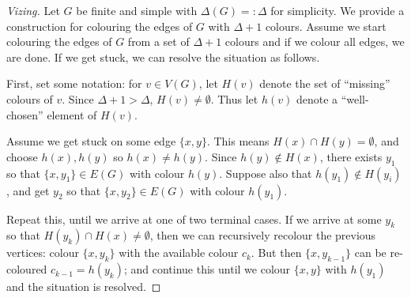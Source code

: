 \documentclass[12pt, a4paper]{book}
\theoremstyle{nonumberplain}
\newtheorem{proof}{Proof}
\begin{document}
\begin{proof}[Vizing]
    Let $G$ be finite and simple with $\Delta(G)=:\Delta$ for simplicity.
    We provide a construction for colouring the edges of $G$ with $\Delta+1$ colours.
    Assume we start colouring the edges of $G$ from a set of $\Delta+1$ colours and if we colour all edges, we are done.
    If we get stuck, we can resolve the situation as follows.

    First, set some notation: for $v\in V(G)$, let $H(v)$ denote the set of ``missing'' colours of $v$.
    Since $\Delta+1>\Delta$, $H(v)\neq\emptyset$.
    Thus let $h(v)$ denote a ``well-chosen'' element of $H(v)$.
    \begin{center}
    \end{center}
    Assume we get stuck on some edge $\{x,y\}$.
    This means $H(x)\cap H(y)=\emptyset$, and choose $h(x),h(y)$ so $h(x)\neq h(y)$.
    Since $h(y)\notin H(x)$, there exists $y_1$ so that $\{x,y_1\}\in E(G)$ with colour $h(y)$.
    Suppose also that $h(y_1)\notin H(y_i)$, and get $y_2$ so that $\{x,y_2\}\in E(G)$ with colour $h(y_1)$.

    Repeat this, until we arrive at one of two terminal cases.
    If we arrive at some $y_k$ so that $H(y_k)\cap H(x)\neq\emptyset$, then we can recursively recolour the previous vertices: colour $\{x,y_k\}$ with the available colour $c_k$.
    But then $\{x,y_{k-1}\}$ can be re-coloured $c_{k-1}=h(y_k)$; and continue this until we colour $\{x,y\}$ with $h(y_1)$ and the situation is resolved.


\end{proof}
\end{document}

